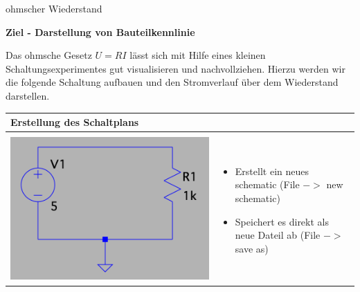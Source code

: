 \begin{frame}[t]{ohmscher Wiederstand}

    \textbf{Ziel - Darstellung von Bauteilkennlinie}
    
    \begin{spacing}{0.6} \begin{tiny}
    
    Das ohmsche Gesetz $U=R I$ lässt sich mit Hilfe eines kleinen Schaltungsexperimentes gut visualisieren und nachvollziehen. 
    Hierzu werden wir die folgende Schaltung aufbauen und den Stromverlauf über dem Wiederstand darstellen. 
    \end{tiny} \end{spacing}
    \begin{spacing}{0.9} \begin{tiny}
    \begin{table}[h!]
      \begin{tabular}{p{3cm} p{7cm}}
        \hline
        \textbf{Erstellung des Schaltplans} & \\
        \hline \\
        \begin{minipage}{.3\textwidth}
          \includegraphics[width=\linewidth]{pictures/res.png}
        \end{minipage} 
        & 
        \begin{minipage}{.7\textwidth}
        \begin{itemize}
          \item Erstellt ein neues schematic (File $->$ new schematic)
          \item Speichert es direkt als neue Dateil ab (File $->$ save as)

\end{itemize}
\end{minipage}
\end{tabular}
\end{table}
\end{tiny}
\end{spacing}
\end{frame}
